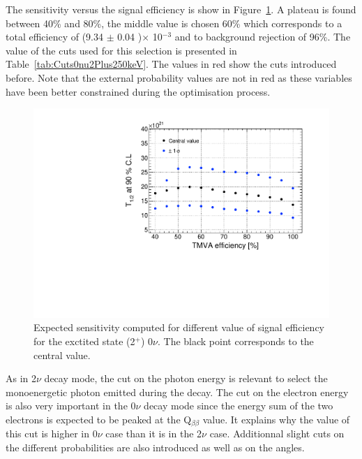 \documentclass[main.tex]{subfiles}
\begin{document}
\FloatBarrier


\bigskip


\NI The sensitivity versus the signal efficiency is show in Figure~\ref{plot:SensVsEffbb0nu2_250}. A plateau is found between 40\% and 80\%, the middle value is chosen 60\% which corresponds to a total efficiency of (9.34 $\pm$ 0.04 )$\times$ 10$^{-\text{3}}$ and to background rejection of 96\%. The value of the cuts used for this selection is presented in Table~\ref{tab:Cuts0nu2Plus250keV}. The values in red show the cuts introduced before. Note that the external probability values are not in red as these variables have been better constrained during the optimisation process.


\begin{figure} [h!]
\begin{center}
\includegraphics[scale=0.5]{pictures/FinalResults/bb0nu2/SensVsEffbb0nu2.pdf}
\end{center}
\caption{Expected sensitivity computed for different value of signal efficiency for the exctited state (2$^+$) 0$\nu$. The black point corresponds to the central value.}
\label{plot:SensVsEffbb0nu2_250}
\end{figure}


\NI As in 2$\nu$ decay mode, the cut on the photon energy is relevant to select the monoenergetic photon emitted during the decay. The cut on the electron energy is also very important in the 0$\nu$ decay mode since the energy sum of the two electrons is expected to be peaked at the Q$_{\beta\beta}$ value. It explains why the value of this cut is higher in 0$\nu$ case than it is in the 2$\nu$ case. Additionnal slight cuts on the different probabilities are also introduced as well as on the angles. 
\end{document}
